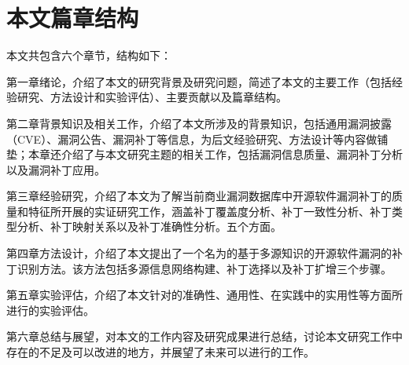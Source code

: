 \section{本文篇章结构}
本文共包含六个章节，结构如下：

第一章绪论，介绍了本文的研究背景及研究问题，简述了本文的主要工作（包括经验研究、方法设计和实验评估）、主要贡献以及篇章结构。

第二章背景知识及相关工作，介绍了本文所涉及的背景知识，包括通用漏洞披露（CVE）、漏洞公告、漏洞补丁等信息，为后文经验研究、方法设计等内容做铺垫；本章还介绍了与本文研究主题的相关工作，包括漏洞信息质量、漏洞补丁分析以及漏洞补丁应用。

第三章经验研究，介绍了本文为了解当前商业漏洞数据库中开源软件漏洞补丁的质量和特征所开展的实证研究工作，涵盖补丁覆盖度分析、补丁一致性分析、补丁类型分析、补丁映射关系以及补丁准确性分析。五个方面。

第四章\tool 方法设计，介绍了本文提出了一个名为\tool 的基于多源知识的开源软件漏洞的补丁识别方法。该方法包括多源信息网络构建、补丁选择以及补丁扩增三个步骤。

第五章实验评估，介绍了本文针对\tool 的准确性、通用性、在实践中的实用性等方面所进行的实验评估。

第六章总结与展望，对本文的工作内容及研究成果进行总结，讨论本文研究工作中存在的不足及可以改进的地方，并展望了未来可以进行的工作。
